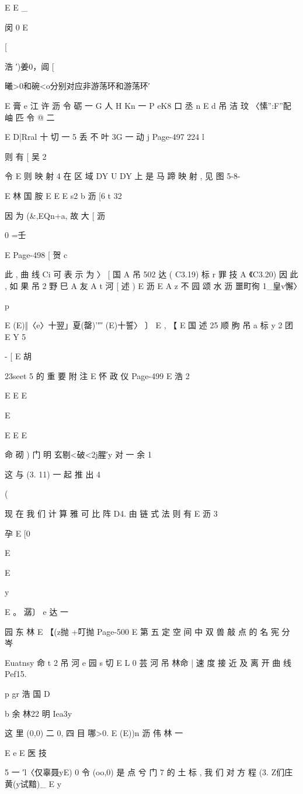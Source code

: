 {{{{{E
E _

闵 0 E

[

浩 ′)姜0，阊 [

曦>0和碗<o分别对应非游荡环和游荡环′

E 膏 e 江 许 沥
令
砺 一 G 人 H Kn 一 P eK8 口 丞 n
E d 吊 洁 玟
〈愫”:F”配岫 匹
令
@ 二 { E D|Rral 十 切 一 5 丢 不 叶 3G 一 动 j
Page-497
224 l

则 有
[ 吴 2

令
E
则 映 射 4 在 区 域 DY U DY 上 是 马 蹄 映 射 , 见 图 5-8-

E 林 国 胺
E
E
E s2
b 沥
[6 t 32

因 为 (&,EQn+a, 故
大 [ 沥

0 =壬

E
Page-498
[ 贺 c

此 , 曲 线 Ci 可 表 示 为
〉 [ 国 A 吊 502 达 ( C3.19)
标 r 罪
技
A 《C3.20)
因 此 , 如 果
吊 2
野
巳 A 友 A t 河
[ 述 )
E 沥
E A z 不 园
颂 水 沥
噩町徇 1_皇v懈〉

p

E (E)‖〈e〉十翌」夏(罄)'″′ (E)十誓〉 〕
E , 【
E 国 述 25 顺 朐 吊 a 标
y
2 团
E Y 5

- [
E 胡

23seet 5
的 重 要 附 注
E 怀 政 仪
Page-499
E 浩 2

E E
E

E

E
E E

命 砌 ) 门
明
玄剔<破<2j腥′y 对 一 余 1

这 与 (3. 11) 一 起 推 出
4

(

现 在 我 们 计 算 雅 可 比 阵 D4. 由 链 式 法 则 有
E 沥 3

孕
E [0

E

E

y

E
。 潺〕 e 达 一

园 东 林
E 【(z抛 +叮抛%
Page-500
E 第 五 定 空 间 中 双 兽 敲 点 的 名 宪 分 岑

Euatnsy 命 t 2 吊 河
e 园 s 切
E L 0 芸 河 吊 林命 |
速 度 接 近 及 离 开 曲 线 Pef15.

p gr 浩
国
D

b 余 林22 明 Iea3y

这 里 (0,0) 二 0, 四 目 哪>0. E (E))n
沥 伟 林 一

E e E
医 技

5 一 ′l〈仅辜聂yE) 0
令 (oo,0) 是 点 兮 门 7 的 土 标 , 我 们 对 方 程 (3. Z们庄黄(y试黯)_
E y

}}}}}}
